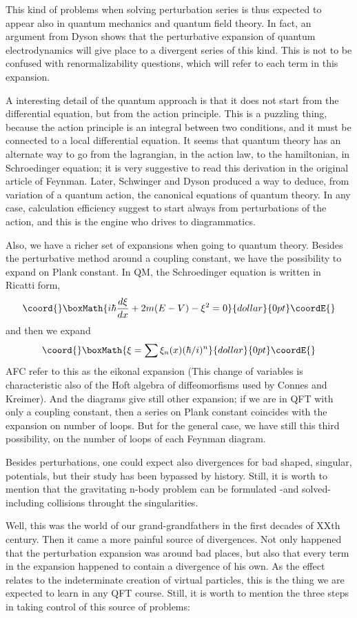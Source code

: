 \documentclass[a4paper,a4paper]{article}
\begin{document}
This kind of problems when solving perturbation series is thus expected to appear 
also in quantum mechanics and quantum field theory. In fact,
an argument from Dyson \cite{dyson} shows that the perturbative expansion of quantum 
electrodynamics will give place to a divergent series of this kind. This is not to be confused 
with renormalizability questions, which will refer to each term in this expansion.

A interesting detail of the quantum approach is that it does not start from the
differential equation, but from the action principle. This is a puzzling thing, because the
action principle is an integral between two conditions, and it must be connected
to a local differential equation. It seems that quantum theory has an alternate
way to go from the lagrangian, in the action law, to the hamiltonian, in 
Schroedinger equation; it is very suggestive to read this derivation in the original 
article of Feynman\cite{feynman}. Later, Schwinger and Dyson produced a way to
deduce, from variation of a quantum action, the canonical equations of quantum theory.
In any case, calculation efficiency suggest to start always from perturbations
of the action, and this is the engine who drives to diagrammatics.

Also, we have a richer set of expansions when going to quantum theory. Besides the 
perturbative method around a coupling constant, we have the possibility to expand on Plank 
constant. In QM, the Schroedinger equation is written in Ricatti form,
$$\coord{}\boxMath{i \hbar {d\xi \over dx} + 2 m (E-V) - \xi^2 =0 }{dollar}{0pt}\coordE{}$$
and then we expand
$$\coord{}\boxMath{\xi = \sum \xi_n(x)  (\hbar / i)^n}{dollar}{0pt}\coordE{}$$
AFC \cite{AFC} refer to this as the eikonal expansion (This change of variables is 
characteristic also of the Hoft algebra of diffeomorfisms used by Connes and Kreimer).
And the diagrams give still other expansion; if we are in QFT with only a coupling constant,
then a series on Plank constant 
coincides with the expansion on number of loops. But for the general case, we have still this 
third possibility, on the number of loops of each Feynman diagram.

Besides perturbations, one could expect also divergences for bad shaped, singular, 
potentials, but their study has 
been bypassed by history. Still, it is worth to mention that the gravitating n-body problem 
can be formulated -and solved- including collisions throught the singularities. 

Well, this was the world of our grand-grandfathers in the first decades of XXth century. 
Then it came a more painful source of divergences. Not only happened that the perturbation 
expansion was around bad places, but also that every term in the expansion happened to 
contain a divergence of his own. As the effect relates to the indeterminate creation of 
virtual particles, this is the thing we are expected to learn in any QFT course. Still, it is 
worth to mention the three steps in taking control of this source of problems:
\end{document}
